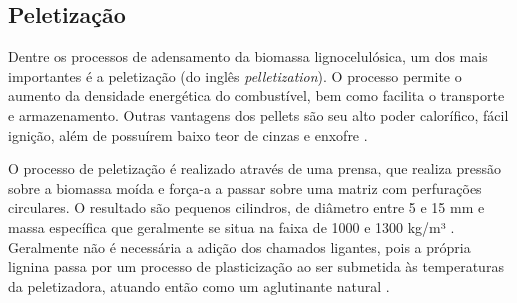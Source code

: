 \subsection{Peletização}
Dentre os processos de adensamento da biomassa lignocelulósica, um dos mais importantes é a peletização (do inglês \textit{pelletization}). O processo permite o aumento da densidade energética do combustível, bem como facilita o transporte e armazenamento. Outras vantagens dos pellets são seu alto poder calorífico, fácil ignição, além de possuírem baixo teor de cinzas e enxofre \cite{Lin2021}. 

O processo de peletização é realizado através de uma prensa, que realiza pressão sobre a biomassa moída e força-a a passar sobre uma matriz com perfurações circulares. O resultado são pequenos cilindros, de diâmetro entre 5 e 15 mm e massa específica que geralmente se situa na faixa de 1000 e 1300 kg/m³ \cite{Amazonia}. Geralmente não é necessária a adição dos chamados ligantes, pois a própria lignina passa por um processo de plasticização ao ser submetida às temperaturas da peletizadora, atuando então como um aglutinante natural \cite{Sena2021}.

